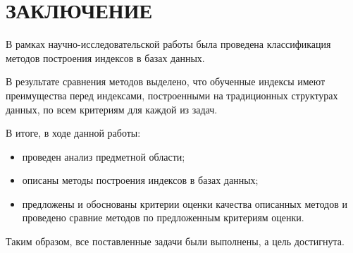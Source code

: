 \chapter*{ЗАКЛЮЧЕНИЕ}

В рамках научно-исследовательской работы была проведена классификация методов
построения индексов в базах данных.

В результате сравнения методов выделено, что обученные индексы имеют
преимущества перед индексами, построенными на традиционных структурах данных, по
всем критериям для каждой из задач.

В итоге, в ходе данной работы:
\begin{itemize}
    \item проведен анализ предметной области;
    \item описаны методы построения индексов в базах данных;
    \item предложены и обоснованы критерии оценки качества описанных методов
      и проведено сравние методов по предложенным критериям оценки.
\end{itemize}

Таким образом, все поставленные задачи были выполнены, а цель достигнута.

